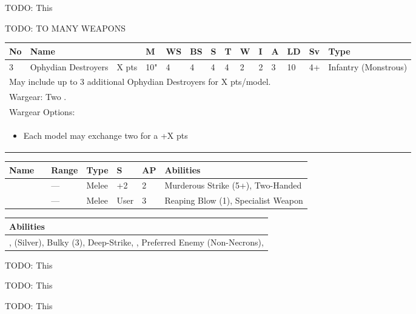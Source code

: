 \newpage
{}


TODO: This

\newpage
{}

TODO: TO MANY WEAPONS
 
\noindent
\begin{tabular}{||m{10pt} m{95pt} m{30pt} m{11pt} m{11pt} m{11pt} m{11pt} m{11pt} m{11pt} m{11pt} m{11pt} m{11pt} m{11pt} m{125pt}||}
	\hline
	No & Name & & M & WS & BS & S & T & W & I & A & LD & Sv & Type \\
	\hline
	3 & Ophydian Destroyers & X pts & 10" & 4 & 4 & 4 & 4 & 2 & 2 & 3 & 10 & 4+ & Infantry (Monstrous) \\
	\hline
	\hline
	\multicolumn{14}{||Z{532 pt}||}{May include up to 3 additional Ophydian Destroyers for X pts/model.}\\	
	\hline
	\hline
	\multicolumn{14}{||Z{532 pt}||}{Wargear: Two \quickref{Hyperphase Thresher}.} \\
	\multicolumn{14}{||Z{532 pt}||}{Wargear Options:} \\	\multicolumn{14}{||Z{532 pt}||}{\begin{itemize}
			\item Each model may exchange two \quickref{Hyperphase Thresher} for a \quickref{Hyperphase Reap-Blade} \hrulefill +X pts
	\end{itemize}} \\
	\hline
\end{tabular}

\noindent
\begin{tabular}{||m{110pt} m{30pt} m{31pt} m{55pt} m{12pt} m{12pt} m{210pt}||}
	\hline
	Name & & Range & Type & S & AP & Abilities \\
	\hline
	\quickref{Hyperphase Reap-Blade} &  & — & Melee & +2 & 2 & Murderous Strike (5+), Two-Handed \\
	\quickref{Hyperphase Thresher} &  & — & Melee & User & 3 & Reaping Blow (1), Specialist Weapon \\
	\hline
\end{tabular}

\noindent
\begin{tabular}{||m{532pt}||}
	\hline
	Abilities \\
	\hline
	\quickref{Annihilation Protocols}, \quickref{Awakening Protocols} (Silver), Bulky (3), Deep-Strike, \quickref{Living Metal}, Preferred Enemy (Non-Necrons), \quickref{Reanimation Protocols} \\
	\hline
\end{tabular}



\newpage
{}


TODO: This

\newpage
{}

TODO: This

\newpage
{}
TODO: This

